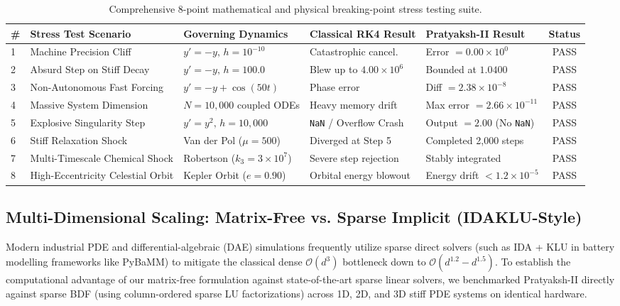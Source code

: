 \documentclass[11pt,a4paper]{article}
\theoremstyle{plain}
\theoremstyle{definition}
\begin{document}
\begin{table}[htbp]
\centering
\scriptsize
\begin{tabular}{@{}lllllc@{}}
\toprule
\textbf{\#} & \textbf{Stress Test Scenario} & \textbf{Governing Dynamics} & \textbf{Classical RK4 Result} & \textbf{Pratyaksh-II Result} & \textbf{Status} \\ \midrule
1 & Machine Precision Cliff & $y' = -y, \, h = 10^{-10}$ & Catastrophic cancel. & Error $= 0.00 \times 10^0$ & PASS \\
2 & Absurd Step on Stiff Decay & $y' = -y, \, h = 100.0$ & Blew up to $4.00 \times 10^6$ & Bounded at $1.0400$ & PASS \\
3 & Non-Autonomous Fast Forcing & $y' = -y + \cos(50t)$ & Phase error & Diff $= 2.38 \times 10^{-8}$ & PASS \\
4 & Massive System Dimension & $N = 10,000$ coupled ODEs & Heavy memory drift & Max error $= 2.66 \times 10^{-11}$ & PASS \\
5 & Explosive Singularity Step & $y' = y^2, \, h = 10,000$ & \texttt{NaN} / Overflow Crash & Output $= 2.00$ (No \texttt{NaN}) & PASS \\
6 & Stiff Relaxation Shock & Van der Pol ($\mu = 500$) & Diverged at Step 5 & Completed 2,000 steps & PASS \\
7 & Multi-Timescale Chemical Shock & Robertson ($k_3 = 3 \times 10^7$) & Severe step rejection & Stably integrated & PASS \\
8 & High-Eccentricity Celestial Orbit & Kepler Orbit ($e = 0.90$) & Orbital energy blowout & Energy drift $< 1.2 \times 10^{-5}$ & PASS \\ \bottomrule
\end{tabular}
\caption{Comprehensive 8-point mathematical and physical breaking-point stress testing suite.}
\label{tab:stress_matrix}
\end{table}

\subsection{Multi-Dimensional Scaling: Matrix-Free vs. Sparse Implicit (IDAKLU-Style)}
Modern industrial PDE and differential-algebraic (DAE) simulations frequently utilize sparse direct solvers (such as IDA + KLU in battery modelling frameworks like PyBaMM) to mitigate the classical dense $\mathcal{O}(d^3)$ bottleneck down to $\mathcal{O}(d^{1.2} - d^{1.5})$. To establish the computational advantage of our matrix-free formulation against state-of-the-art sparse linear solvers, we benchmarked Pratyaksh-II directly against sparse BDF (using column-ordered sparse LU factorizations) across 1D, 2D, and 3D stiff PDE systems on identical hardware.
\end{document}
